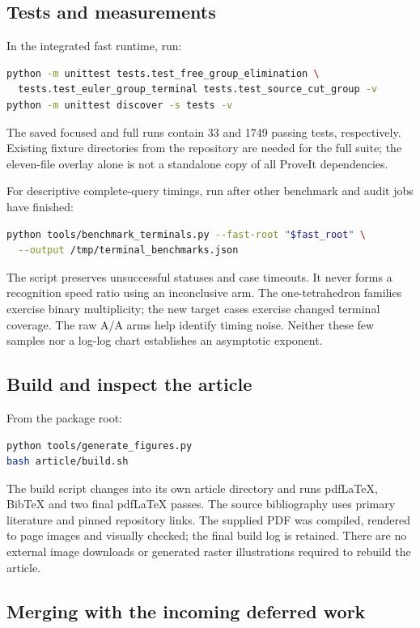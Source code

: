 \subsection{Tests and measurements}

In the integrated fast runtime, run:
\begin{lstlisting}[language=bash]
python -m unittest tests.test_free_group_elimination \
  tests.test_euler_group_terminal tests.test_source_cut_group -v
python -m unittest discover -s tests -v
\end{lstlisting}
The saved focused and full runs contain 33 and 1749 passing tests,
respectively. Existing fixture directories from the repository are needed for
the full suite; the eleven-file overlay alone is not a standalone copy of all
ProveIt dependencies.

For descriptive complete-query timings, run after other benchmark and audit
jobs have finished:
\begin{lstlisting}[language=bash]
python tools/benchmark_terminals.py --fast-root "$fast_root" \
  --output /tmp/terminal_benchmarks.json
\end{lstlisting}
The script preserves unsuccessful statuses and case timeouts. It never forms
a recognition speed ratio using an inconclusive arm. The one-tetrahedron
families exercise binary multiplicity; the new target cases exercise changed
terminal coverage. The raw A/A arms help identify timing noise. Neither these
few samples nor a log-log chart establishes an asymptotic exponent.

\subsection{Build and inspect the article}

From the package root:
\begin{lstlisting}[language=bash]
python tools/generate_figures.py
bash article/build.sh
\end{lstlisting}
The build script changes into its own article directory and runs pdf\LaTeX,
BibTeX and two final pdf\LaTeX{} passes. The source bibliography uses primary
literature and pinned repository links. The supplied PDF was compiled, rendered
to page images and visually checked; the final build log is retained. There
are no external image downloads or generated raster illustrations required to
rebuild the article.

\subsection{Merging with the incoming deferred work}

